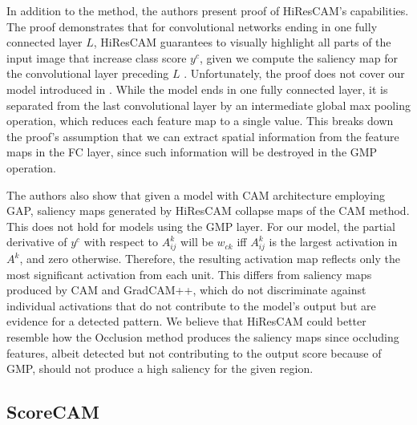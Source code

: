 In addition to the method, the authors present proof of HiResCAM's capabilities.
The proof demonstrates that for convolutional networks ending in one fully connected layer $L$, HiResCAM guarantees to visually highlight all parts of the input image that increase class score $y^c$, given we compute the saliency map for the convolutional layer preceding $L$ \cite{hires-cam}.
Unfortunately, the proof does not cover our model introduced in .
While the model ends in one fully connected layer, it is separated from the last convolutional layer by an intermediate global max pooling operation, which reduces each feature map to a single value.
This breaks down the proof's assumption that we can extract spatial information from the feature maps in the FC layer, since such information will be destroyed in the GMP operation. 

The authors also show that given a model with CAM architecture employing GAP, saliency maps generated by HiResCAM collapse maps of the CAM method.
This does not hold for models using the GMP layer.
For our model, the partial derivative of $y^c$ with respect to $A^k_{ij}$ will be $w_{ck}$ iff $A^k_{ij}$ is the largest activation in $A^k$, and zero otherwise.
Therefore, the resulting activation map reflects only the most significant activation from each unit.
This differs from saliency maps produced by CAM and GradCAM++, which do not discriminate against individual activations that do not contribute to the model's output but are evidence for a detected pattern.
We believe that HiResCAM could better resemble how the Occlusion method produces the saliency maps since occluding features, albeit detected but not contributing to the output score because of GMP, should not produce a high saliency for the given region.

\subsection{ScoreCAM}

